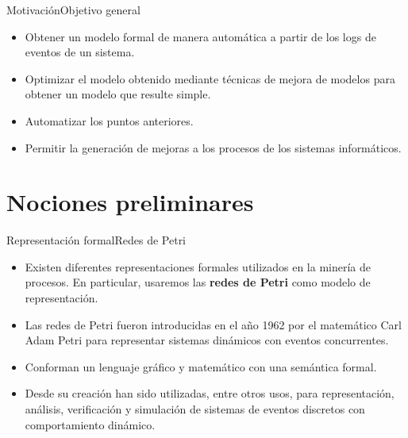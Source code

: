 \documentclass[spanish,pdf]{beamer}
\begin{document}
\begin{frame}{Motivación}{Objetivo general}
  \begin{itemize}
    \setlength\itemsep{0.4cm}

    \item<1-> Obtener un modelo formal de manera automática a partir de los logs de eventos de un sistema.
    
    \item<2-> Optimizar el modelo obtenido mediante técnicas de mejora de modelos para obtener un modelo que
          resulte simple.
    
    \item<3-> Automatizar los puntos anteriores.

    \item<4-> Permitir la generación de mejoras a los procesos de los sistemas informáticos.
  
  \end{itemize}
\end{frame}

\section{Nociones preliminares}

\begin{frame}{Representación formal}{Redes de Petri}
    \begin{itemize}
      \setlength\itemsep{0.3cm}
      \item<2-> Existen diferentes representaciones formales utilizados en la minería de procesos.
                En particular, usaremos las \textbf{redes de Petri} como modelo de representación.
      \item<3-> Las redes de Petri fueron introducidas en el año 1962 por el matemático Carl Adam Petri
                para representar sistemas dinámicos con eventos concurrentes.
      \item<4-> Conforman un lenguaje gráfico y matemático con una semántica formal.
      \item<5-> Desde su creación han sido utilizadas, entre otros usos, para representación,
                análisis, verificación y simulación de sistemas de eventos discretos con 
                comportamiento dinámico.
    \end{itemize}
\end{frame}
\end{document}
